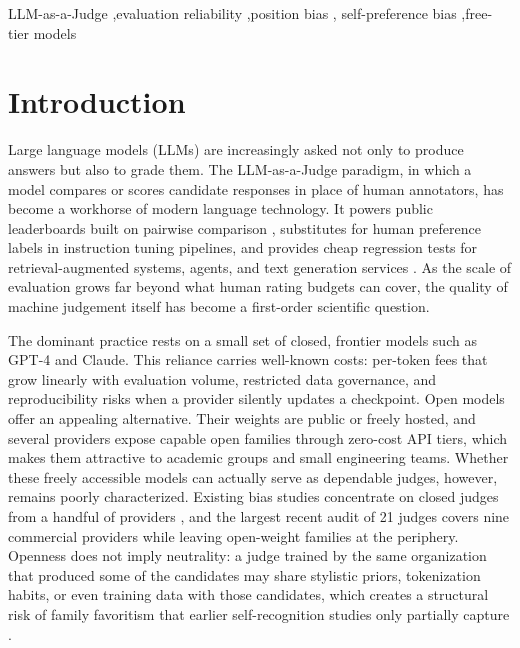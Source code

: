\documentclass[review,12pt]{elsarticle}
\begin{document}
\begin{frontmatter}
\begin{keyword}
LLM-as-a-Judge \sep evaluation reliability \sep position bias \sep
self-preference bias \sep free-tier models
\end{keyword}

\end{frontmatter}

\section{Introduction}
\label{sec:intro}

Large language models (LLMs) are increasingly asked not only to produce
answers but also to grade them. The LLM-as-a-Judge paradigm, in which a model
compares or scores candidate responses in place of human annotators, has
become a workhorse of modern language technology. It powers public leaderboards
built on pairwise comparison \citep{zheng2023judging}, substitutes for human
preference labels in instruction tuning pipelines, and provides cheap
regression tests for retrieval-augmented systems, agents, and text generation
services \citep{liu2023geval,gu2024survey}. As the scale of evaluation grows
far beyond what human rating budgets can cover, the quality of machine
judgement itself has become a first-order scientific question.

The dominant practice rests on a small set of closed, frontier models such as
GPT-4 and Claude. This reliance carries well-known costs: per-token fees that
grow linearly with evaluation volume, restricted data governance, and
reproducibility risks when a provider silently updates a checkpoint. Open
models offer an appealing alternative. Their weights are public or freely
hosted, and several providers expose capable open families through zero-cost
API tiers, which makes them attractive to academic groups and small
engineering teams. Whether these freely accessible models can actually serve
as dependable judges, however, remains poorly characterized. Existing bias
studies concentrate on closed judges from a handful of providers
\citep{zheng2023judging,chen2024humans,norman2026reliability}, and the
largest recent audit of 21 judges covers nine commercial providers while
leaving open-weight families at the periphery. Openness does not imply
neutrality: a judge trained by the same organization that produced some of the
candidates may share stylistic priors, tokenization habits, or even training
data with those candidates, which creates a structural risk of family
favoritism that earlier self-recognition studies only partially capture
\citep{panickssery2024llm}.
\end{document}
